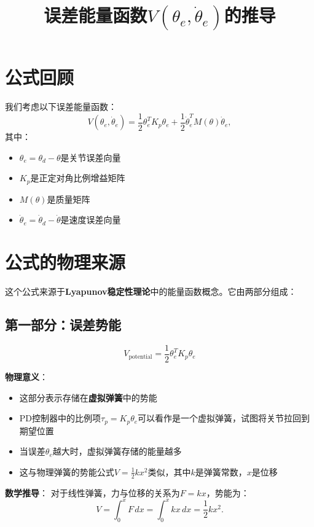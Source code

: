 \documentclass{article}
\title{误差能量函数$V(\theta_e, \dot{\theta}_e)$的推导}
\author{}
\date{}
\begin{document}
\maketitle

\section{公式回顾}

我们考虑以下误差能量函数：
\begin{equation}
V(\theta_e, \dot{\theta}_e) = \frac{1}{2}\theta_e^T K_p\theta_e + \frac{1}{2}\dot{\theta}_e^T M(\theta)\dot{\theta}_e,
\end{equation}
其中：
\begin{itemize}
\item $\theta_e = \theta_d - \theta$是关节误差向量
\item $K_p$是正定对角比例增益矩阵
\item $M(\theta)$是质量矩阵
\item $\dot{\theta}_e = \dot{\theta}_d - \dot{\theta}$是速度误差向量
\end{itemize}

\section{公式的物理来源}

这个公式来源于\textbf{Lyapunov稳定性理论}中的能量函数概念。它由两部分组成：

\subsection{第一部分：误差势能}

\begin{equation}
V_{\text{potential}} = \frac{1}{2}\theta_e^T K_p\theta_e
\end{equation}

\textbf{物理意义}：
\begin{itemize}
\item 这部分表示存储在\textbf{虚拟弹簧}中的势能
\item PD控制器中的比例项$\tau_p = K_p\theta_e$可以看作是一个虚拟弹簧，试图将关节拉回到期望位置
\item 当误差$\theta_e$越大时，虚拟弹簧存储的能量越多
\item 这与物理弹簧的势能公式$V = \frac{1}{2}kx^2$类似，其中$k$是弹簧常数，$x$是位移
\end{itemize}

\textbf{数学推导}：
对于线性弹簧，力与位移的关系为$F = kx$，势能为：
\begin{equation}
V = \int_0^x F \, dx = \int_0^x kx \, dx = \frac{1}{2}kx^2.
\end{equation}
\end{document}
